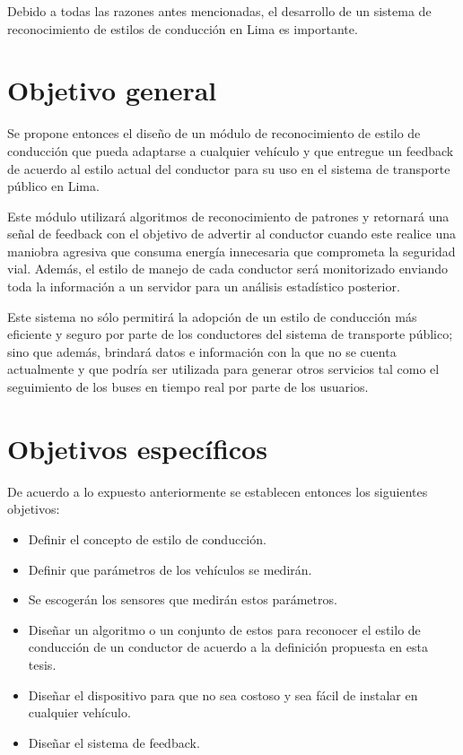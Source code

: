 Debido a todas las razones antes mencionadas, el desarrollo de un sistema de reconocimiento de estilos de conducción en Lima es importante.


\section{Objetivo general}
Se propone entonces el diseño de un módulo de reconocimiento de estilo de conducción que pueda adaptarse a cualquier vehículo y que entregue un feedback de acuerdo al estilo actual del conductor para su uso en el sistema de transporte público en Lima.

Este módulo utilizará algoritmos de reconocimiento de patrones y retornará una señal de feedback con el objetivo de advertir al conductor cuando este realice una maniobra agresiva que consuma energía innecesaria que comprometa la seguridad vial. Además, el estilo de manejo de cada conductor será monitorizado enviando toda la información a un servidor para un análisis estadístico posterior.

Este sistema no sólo permitirá la adopción de un estilo de conducción más eficiente y seguro por parte de los conductores del sistema de transporte público; sino que además, brindará datos e información con la que no se cuenta actualmente y que podría ser utilizada para generar otros servicios tal como el seguimiento de los buses en tiempo real por parte de los usuarios.

\section{Objetivos específicos}
De acuerdo a lo expuesto anteriormente se establecen entonces los siguientes objetivos:

\begin{itemize}
    \itemsep0em
    \item Definir el concepto de estilo de conducción.
    \item Definir que parámetros de los vehículos se medirán.
    \item Se escogerán los sensores que medirán estos parámetros.
    \item Diseñar un algoritmo o un conjunto de estos para reconocer el estilo de conducción de un conductor de acuerdo a la definición propuesta en esta tesis.
    \item Diseñar el dispositivo para que no sea costoso y sea fácil de instalar en cualquier vehículo.
    \item Diseñar el sistema de feedback.
\end{itemize}

